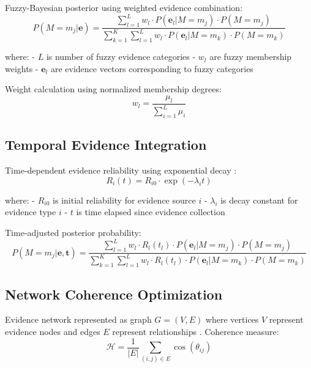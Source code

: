 Fuzzy-Bayesian posterior using weighted evidence combination:
\begin{equation}
P(M = m_j | \mathbf{e}) = \frac{\sum_{l=1}^L w_l \cdot P(\mathbf{e}_l | M = m_j) \cdot P(M = m_j)}{\sum_{k=1}^K \sum_{l=1}^L w_l \cdot P(\mathbf{e}_l | M = m_k) \cdot P(M = m_k)}
\end{equation}

where:
- $L$ is number of fuzzy evidence categories
- $w_l$ are fuzzy membership weights
- $\mathbf{e}_l$ are evidence vectors corresponding to fuzzy categories

Weight calculation using normalized membership degrees:
\begin{equation}
w_l = \frac{\mu_l}{\sum_{i=1}^L \mu_i}
\end{equation}

\subsection{Temporal Evidence Integration}

Time-dependent evidence reliability using exponential decay \cite{cox1962renewal}:
\begin{equation}
R_i(t) = R_{i0} \cdot \exp(-\lambda_i t)
\end{equation}

where:
- $R_{i0}$ is initial reliability for evidence source $i$
- $\lambda_i$ is decay constant for evidence type $i$
- $t$ is time elapsed since evidence collection

Time-adjusted posterior probability:
\begin{equation}
P(M = m_j | \mathbf{e}, \mathbf{t}) = \frac{\sum_{l=1}^L w_l \cdot R_l(t_l) \cdot P(\mathbf{e}_l | M = m_j) \cdot P(M = m_j)}{\sum_{k=1}^K \sum_{l=1}^L w_l \cdot R_l(t_l) \cdot P(\mathbf{e}_l | M = m_k) \cdot P(M = m_k)}
\end{equation}

\subsection{Network Coherence Optimization}

Evidence network represented as graph $G = (V, E)$ where vertices $V$ represent evidence nodes and edges $E$ represent relationships \cite{newman2003structure}. Coherence measure:
\begin{equation}
\mathcal{H} = \frac{1}{|E|} \sum_{(i,j) \in E} \cos(\theta_{ij})
\end{equation}

